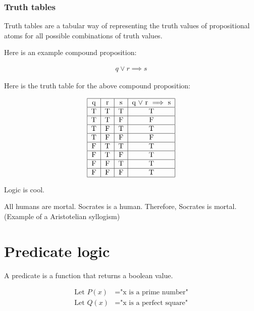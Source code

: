 \documentclass{article}
\begin{document}
\subsubsection{Truth tables}

Truth tables are a tabular way of representing the truth values of propositional atoms for all possible combinations of truth values.

Here is an example compound proposition:

\begin{align*}
    q \lor r \implies s
\end{align*}

Here is the truth table for the above compound proposition:

\begin{align*}
    \begin{tabular}{|c|c|c|c|}
        \hline
        q & r & s & q $\lor$ r $\implies$ s \\
        \hline
        T & T & T & T                       \\
        \hline
        T & T & F & F                       \\
        \hline
        T & F & T & T                       \\
        \hline
        T & F & F & F                       \\
        \hline
        F & T & T & T                       \\
        \hline
        F & T & F & T                       \\
        \hline
        F & F & T & T                       \\
        \hline
        F & F & F & T                       \\
        \hline
    \end{tabular}
\end{align*}

Logic is cool.

All humans are mortal.
Socrates is a human.
Therefore, Socrates is mortal.
(Example of a Aristotelian syllogism)

\section{Predicate logic}

A predicate is a function that returns a boolean value.

\begin{align*}
    \text{Let } P(x) & = \text{"x is a prime number"} \\
    \text{Let } Q(x) & = \text{"x is a perfect square"}
\end{align*}
\end{document}
